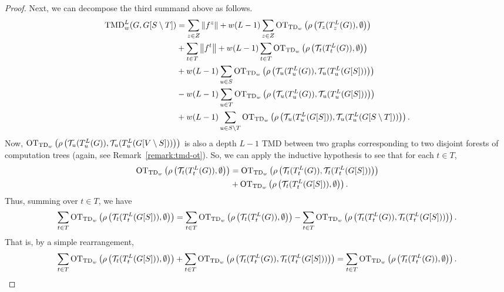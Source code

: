 \begin{proof}
Next, we can decompose the third summand above as follows. 
\begin{align}\label{eq:new_eq}
    \textnormal{TMD}_{w}^L(G, G[S \setminus T]) &= \sum_{z \in Z}\left\lVert f^z\right\rVert + w(L-1) \sum_{z \in Z} \textnormal{OT}_{\textnormal{TD}_{w}}\left(\rho\left(\mathcal T_z(T_z^L(G)), \emptyset \right ) \right ) \\ 
    &+ \sum_{t \in T} \left\lVert f^t\right\rVert + w(L-1) \sum_{t \in T} \textnormal{OT}_{\textnormal{TD}_{w}}\left(\rho\left(\mathcal T_t(T_t^L(G)), \emptyset \right ) \right ) \notag\\
    &+ w(L-1) \sum_{u \in S} \textnormal{OT}_{\textnormal{TD}_{w}}\left(\rho\left(\mathcal T_u(T_u^L(G)), \mathcal T_u(T_u^L(G[S])) \right ) \right ) \notag \\
    &- w(L-1) \sum_{u \in T} \textnormal{OT}_{\textnormal{TD}_{w}}\left(\rho\left(\mathcal T_u(T_u^L(G)), \mathcal T_u(T_u^L(G[S])) \right ) \right ) \notag \\
    &+ w(L-1) \sum_{u \in S \setminus{T}}  \textnormal{OT}_{\textnormal{TD}_{w}}\left(\rho\left(\mathcal T_u(T_u^L(G[S])), \mathcal T_u(T_u^L(G[S \setminus T])) \right ) \right ).\notag
\end{align}
Now, $\textnormal{OT}_{\textnormal{TD}_{w}}\left(\rho\left(\mathcal T_u(T_u^L(G)), \mathcal T_u(T_u^L(G[V \setminus S])) \right ) \right )$ is also a depth $L-1$ TMD between two graphs corresponding to two disjoint forests of computation trees (again, see Remark~\ref{remark:tmd-ot}). So, we can apply the inductive hypothesis to see that for each $t \in T$,
\begin{align*}
    \textnormal{OT}_{\textnormal{TD}_{w}}\left(\rho\left(\mathcal T_t(T_t^L(G)), \emptyset \right ) \right ) &= \textnormal{OT}_{\textnormal{TD}_{w}}\left(\rho\left(\mathcal T_t(T_t^L(G)), \mathcal T_t(T_t^L(G[S])) \right ) \right ) \\
    &+ \textnormal{OT}_{\textnormal{TD}_{w}}\left(\rho\left(\mathcal T_t(T_t^L(G[S])), \emptyset \right ) \right ). 
\end{align*}
Thus, summing over $t \in T$, we have
\begin{align*}
        \sum_{t \in T} \textnormal{OT}_{\textnormal{TD}_{w}}\left(\rho\left(\mathcal T_t(T_t^L(G[S])), \emptyset \right ) \right )   = \sum_{t \in T} \textnormal{OT}_{\textnormal{TD}_{w}}\left(\rho\left(\mathcal T_t(T_t^L(G)), \emptyset \right ) \right ) - \sum_{t \in T} \textnormal{OT}_{\textnormal{TD}_{w}}\left(\rho\left(\mathcal T_t(T_t^L(G)), \mathcal T_t(T_t^L(G[S])) \right ) \right ). 
\end{align*}
That is, by a simple rearrangement,
\begin{align*}
        \sum_{t \in T} \textnormal{OT}_{\textnormal{TD}_{w}}\left(\rho\left(\mathcal T_t(T_t^L(G[S])), \emptyset \right ) \right )   + \sum_{t \in T} \textnormal{OT}_{\textnormal{TD}_{w}}\left(\rho\left(\mathcal T_t(T_t^L(G)), \mathcal T_t(T_t^L(G[S])) \right ) \right ) = \sum_{t \in T} \textnormal{OT}_{\textnormal{TD}_{w}}\left(\rho\left(\mathcal T_t(T_t^L(G)), \emptyset \right ) \right ).
\end{align*}


\end{proof}
